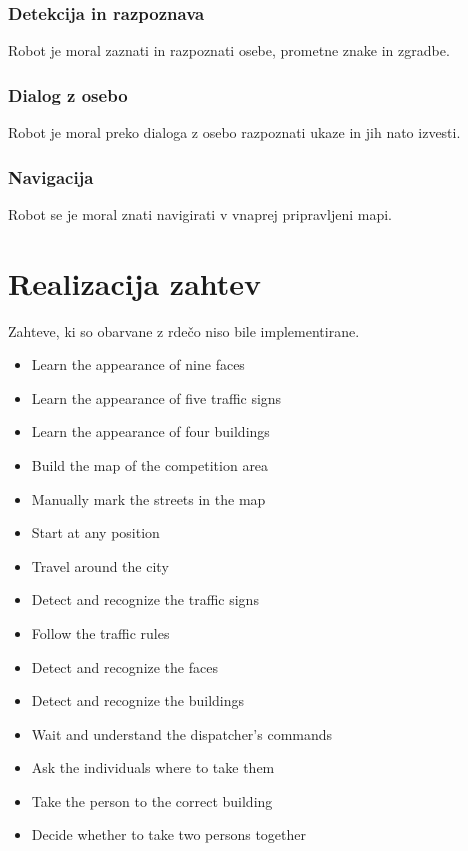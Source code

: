 \documentclass[a4paper,11pt]{article}
\begin{document}
\subsubsection{Detekcija in razpoznava}
Robot je moral zaznati in razpoznati osebe, prometne znake in zgradbe.
\subsubsection{Dialog z osebo}
Robot je moral preko dialoga z osebo razpoznati ukaze in jih nato izvesti.
\subsubsection{Navigacija}
Robot se je moral znati navigirati v vnaprej pripravljeni mapi.


\section{Realizacija zahtev}
Zahteve, ki so obarvane z rdečo niso bile implementirane.

\begin{itemize}
	\color{green}
	\item Learn the appearance of nine faces
	\item {\color{red}Learn the appearance of five traffic signs}
	\item {\color{red}Learn the appearance of four buildings}
	\item Build the map of the competition area
	\item Manually mark the streets in the map
	\item Start at any position
	\item Travel around the city
	\item {\color{red}Detect and recognize the traffic signs}
	\item {\color{red}Follow the traffic rules}
	\item Detect and recognize the faces
	\item {\color{red}Detect and recognize the buildings}
	\item Wait and understand the dispatcher's commands
	\item Ask the individuals where to take them
	\item Take the person to the correct building
	\item {\color{red}Decide whether to take two persons together}
\end{itemize}
\end{document}
